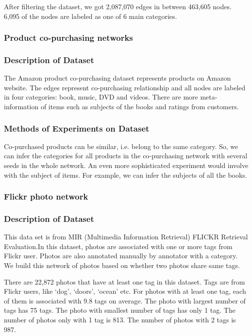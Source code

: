 After filtering the dataset, we got 2,087,070 edges in between 463,605 nodes. 6,095 of the nodes are labeled as one of 6 main categories.



\subsubsection{Product co-purchasing networks}

\subsubsection*{Description of Dataset}
The Amazon product co-purchasing dataset represents products on Amazon website. The edges represent co-purchasing relationship and all nodes are labeled in four categories: book, music, DVD and videos. There are more meta-information of items such as subjects of the books and ratings from customers.

\subsubsection*{Methods of Experiments on Dataset}

Co-purchased products can be similar, i.e. belong to the same category.
So, we can infer the categories for all products in the co-purchasing network with several seeds in the whole network.
An even more sophisticated experiment would involve with the subject of items. For example, we can infer the subjects of all the books.

\subsubsection{Flickr photo network}

\subsubsection*{Description of Dataset}
This data set is from MIR (Multimedia Information Retrieval) FLICKR Retrieval Evaluation.In this dataset, photos are associated with one or more tags from Flickr user. Photos are also annotated manually by annotator with a category. We build this network of photos based on whether two photos share same tags. 

There are 22,872 photos that have at least one tag in this dataset. Tags are from Flickr users, like ‘dog’, ‘doors’, ‘ocean’ etc. For photos with at least one tag, each of them is associated with 9.8 tags on average. The photo with largest number of tags has 75 tags. The photo with smallest number of tags has only 1 tag. The number of photos only with 1 tag is 813. The number of photos with 2 tags is 987.

